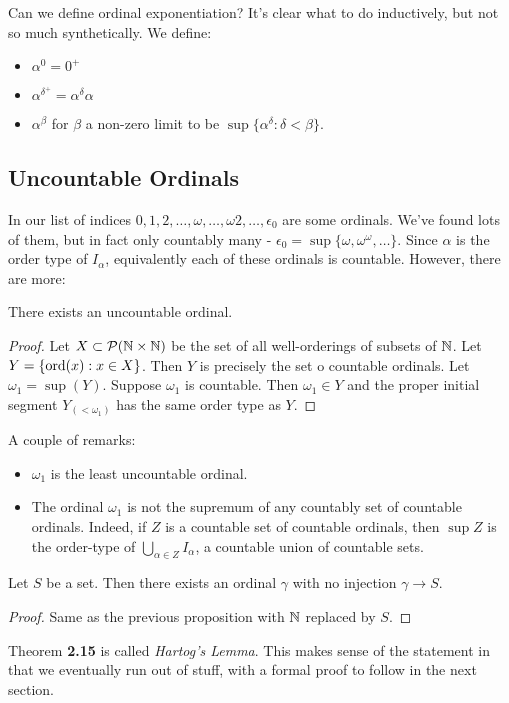 \documentclass[10pt,a4paper]{article}
\begin{document}
Can we define ordinal exponentiation? It's clear what to do inductively, but not so much synthetically. We define:
\begin{itemize}
\item $\alpha^0 = 0^+$
\item $\alpha^{\delta^+} = \alpha^{\delta}\alpha$
\item $\alpha^{\beta}$ for $\beta$ a non-zero limit to be $\sup\{\alpha^\delta: \delta<\beta\}$.
\end{itemize}

\subsection{Uncountable Ordinals}
In \textbf{} our list of indices $0,1,2,\ldots, \omega,\ldots, \omega 2, \ldots, \epsilon_0$ are some ordinals. We've found lots of them, but in fact only countably many - $\epsilon_0 = \sup\{\omega, \omega^{\omega},\ldots\}$. Since $\alpha$ is the order type of $I_{\alpha}$, equivalently each of these ordinals is countable. However, there are more:
\begin{proposition}
There exists an uncountable ordinal.
\end{proposition}
\begin{proof}
Let $X \subset \mathcal{P}(\mathbb{N} \times \mathbb{N})$ be the set of all well-orderings of subsets of $\mathbb{N}$. Let $Y = \{\operatorname{ord}(x)  : x \in X\}$. Then $Y$ is precisely the set o countable ordinals. Let $\omega_1 = \sup(Y)$. Suppose $\omega_1$ is countable. Then $\omega_1 \in Y$ and the proper initial segment $Y_{(<\omega_1)}$ has the same order type as $Y$. \contr
\end{proof}
A couple of remarks:
\begin{itemize}
\item $\omega_1$ is the least uncountable ordinal.
\item The ordinal $\omega_1$ is not the supremum of any countably set of countable ordinals. Indeed, if $Z$ is a countable set of countable ordinals, then $\sup Z$ is the order-type of $\bigcup_{\alpha \in Z}I_{\alpha}$, a countable union of countable sets.
\end{itemize}
\begin{theorem}
Let $S$ be a set. Then there exists an ordinal $\gamma$ with no injection $\gamma \to S$.
\end{theorem}
\begin{proof}
Same as the previous proposition with $\mathbb{N}$ replaced by $S$.
\end{proof}
Theorem \textbf{2.15} is called \emph{Hartog's Lemma}. This makes sense of the statement in \textbf{} that we eventually run out of stuff, with a formal proof to follow in the next section.
\end{document}
